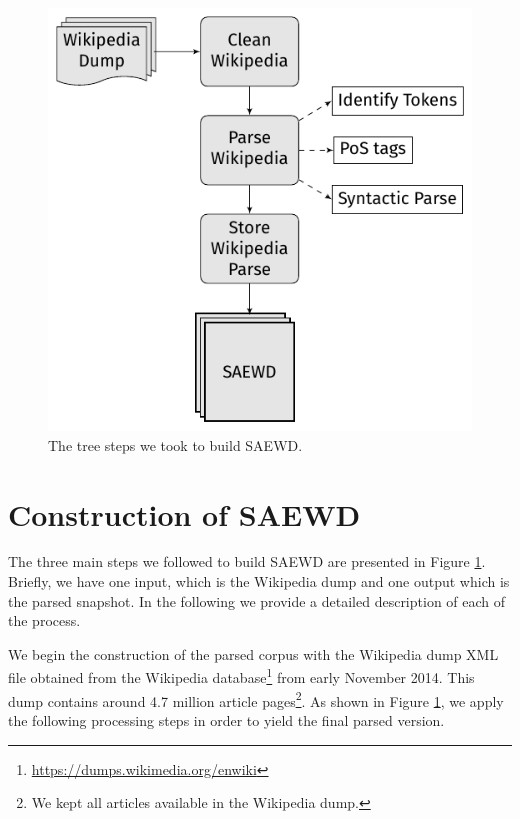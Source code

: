 \begin{figure}[t]

	\centering
	\includegraphics[scale=.8]{images/Chapitre7/flow_chart.pdf}
	\caption{The tree steps we took to build SAEWD.}
	\label{fig:flow}

\end{figure}

\section{Construction of SAEWD}
The three main steps we followed to build SAEWD are presented in Figure \ref{fig:flow}. Briefly, we have one input, which is the Wikipedia dump and one output which is the parsed snapshot. In the following we provide a detailed description of each of the process. 

 
We begin the construction of the parsed corpus with the Wikipedia dump XML file obtained from the Wikipedia database\footnote{\url{https://dumps.wikimedia.org/enwiki}} from early November 2014. This dump  contains around 4.7 million article pages\footnote{We kept all articles available in the Wikipedia dump.}. As shown in Figure \ref{fig:flow}, we apply the following processing steps in order to yield the final parsed version.
 
